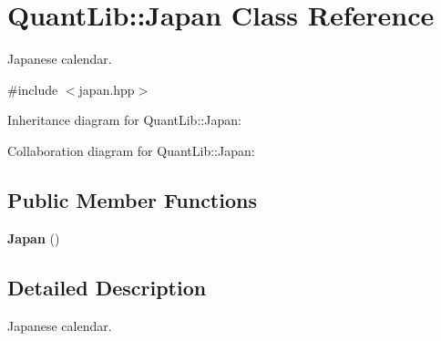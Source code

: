 \section{Quant\+Lib\+:\+:Japan Class Reference}
\label{class_quant_lib_1_1_japan}


Japanese calendar.  




{\ttfamily \#include $<$japan.\+hpp$>$}



Inheritance diagram for Quant\+Lib\+:\+:Japan\+:


Collaboration diagram for Quant\+Lib\+:\+:Japan\+:
\subsection*{Public Member Functions}
\begin{DoxyCompactItemize}
\item 
{\bf Japan} ()
\end{DoxyCompactItemize}


\subsection{Detailed Description}
Japanese calendar. 

